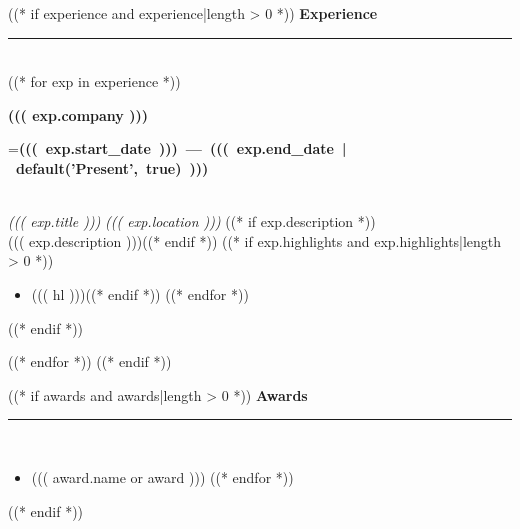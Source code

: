 \documentclass[11pt,a4paper]{article}
\begin{document}
\begin{minipage}[t]{0.65\textwidth}
\begin{minipage}[t]{0.92\textwidth}
((* if experience and experience|length > 0 *))
{\fontsize{12}{14}\selectfont\bfseries\color{blue-pri}\faBriefcase\space Experience} \hfill {\color{border}\rule{0.6\linewidth}{2pt}}\\[10pt]
((* for exp in experience *))
\begin{minipage}{\linewidth}
{\fontsize{10}{12}\selectfont\bfseries ((( exp.company )))} \hfill {\scriptsize\color{white}=\hbox{\textbf{((( exp.start_date ))) --- ((( exp.end_date | default('Present', true) )))}} }\\[2pt]
{\fontsize{9.5}{11}\selectfont\color{blue-pri}\textit{((( exp.title )))}} \hfill {\scriptsize\color{muted}\textit{((( exp.location )))}}
((* if exp.description *))\\[4pt] {\fontsize{9}{12}\selectfont ((( exp.description )))}((* endif *))
((* if exp.highlights and exp.highlights|length > 0 *))
\begin{itemize}[leftmargin=12pt, itemsep=2pt, parsep=0pt, topsep=4pt]
((* for hl in exp.highlights *))((* if hl *))\item {\fontsize{8.5}{11.5}\selectfont ((( hl )))}((* endif *))
((* endfor *))
\end{itemize}
((* endif *))
\end{minipage}
\vspace{15pt}
((* endfor *))
\vspace{10pt}
((* endif *))

((* if awards and awards|length > 0 *))
{\fontsize{12}{14}\selectfont\bfseries\color{blue-pri}\faTrophy\space Awards} \hfill {\color{border}\rule{0.7\linewidth}{2pt}}\\[10pt]
\begin{itemize}[leftmargin=12pt, itemsep=2pt, parsep=0pt, topsep=0pt]
((* for award in awards *))
\item {\fontsize{9}{11}\selectfont ((( award.name or award )))}
((* endfor *))
\end{itemize}
((* endif *))

\end{minipage}
\end{minipage}
\end{document}
